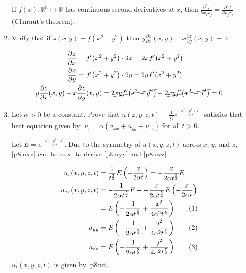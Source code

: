 \documentclass[11pt]{article}
\begin{document}
\begin{enumerate}
  If \(f(x) : \mathbb{R}^n \mapsto \mathbb{R}\) has continuous second
  derivatives at \(x\), then \(\frac{\partial^2 f}{\partial x_ix_j} =
  \frac{\partial^2 f}{\partial x_jx_i}\) (Clairaut's theorem).

\item Verify that if \(z(x, y) = f(x^2 + y^2)\) then \(y \frac{\partial
    z}{\partial x}(x,y) - x \frac{\partial z}{\partial y}(x,y) = 0\).

  \begin{align*}
    \frac{\partial z}{\partial x}
    &= f'{\left(x^2 + y^2\right)} \cdot 2x = 2x
      f'{\left(x^2 + y^2\right)} \\
    \frac{\partial z}{\partial y}
    &= f'{\left( x^2 + y^2 \right)} \cdot 2y = 2y f'{\left( x^2 + y^2 \right)}
    \\
    y \frac{\partial z}{\partial x}(x,y) - x &\frac{\partial z}{\partial
                                               y}(x,y) = \cancel{2xy f'{\left( x^2 + y^2 \right)}} - \cancel{2xy f'{\left( x^2 + y^2
                                               \right)}} = 0
  \end{align*}

\item Let \(\alpha > 0\) be a constant. Prove that \(u(x,y,z,t) =
  \frac{1}{t^{\frac{3}{2}}} e^{-\frac{x^2 + y^2 + z^2}{4\alpha t}}\), satisfies that
  heat equation given by: \(u_t = \alpha\left(u_{xx} + u_{yy} + u_{zz}\right)\) for all
  \(t > 0\).

  Let \(E = e^{-\frac{x^2 + y^2 + z^2}{4\alpha t}}\). Due to the symmetry of
  \(u(x,y,z,t)\) across \(x\), \(y\), and \(z\), \eqref{p8:uxx} can be used
  to derive \eqref{p8:uyy} and \eqref{p8:uzz}.

  \begin{subequations}
    \begin{align*}
      u_x(x,y,z,t) &= \frac{1}{t^{\frac{3}{2}}} E \left( -\frac{x}{2\alpha t}
                     \right) = -\frac{x}{2\alpha t^{\frac{5}{2}}} E \\
      u_{xx}(x,y,z,t) &= -\frac{1}{2\alpha t^{\frac{5}{2}}} E +
                        -\frac{x}{2\alpha t^{\frac{5}{2}}} E \left( -\frac{x}{2\alpha t} \right)
      \\
                   &= E \left( -\frac{1}{2\alpha t^{\frac{5}{2}}} + \frac{x^2}{4 \alpha^2
                     t^{\frac{7}{2}}} \right)
                     \stepcounter{equation}\tag{\theequation}\label{p8:uxx} \\ 
      u_{yy} &= E \left( -\frac{1}{2\alpha t^{\frac{5}{2}}} +
               \frac{y^2}{4\alpha^2 t^{\frac{7}{2}}} \right)
               \stepcounter{equation}\tag{\theequation}\label{p8:uyy} \\
      u_{zz} &= E \left( -\frac{1}{2\alpha t^{\frac{5}{2}}} +
               \frac{y^2}{4\alpha^2 t^{\frac{7}{2}}} \right)
               \stepcounter{equation}\tag{\theequation}\label{p8:uzz} \\
    \end{align*}
  \end{subequations}
  \(u_t(x,y,z,t)\) is given by \eqref{p8:ut}.


\end{enumerate}
\end{document}
